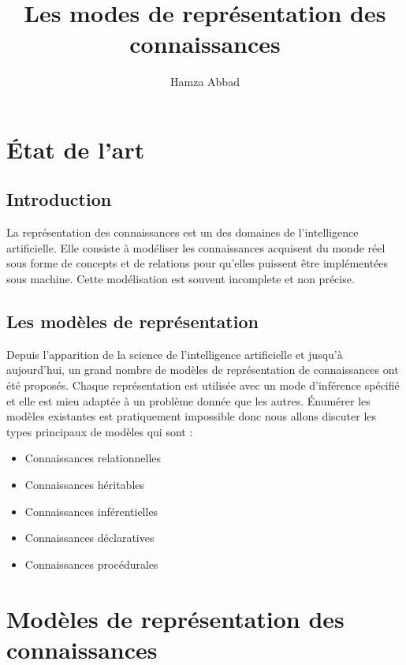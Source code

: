 \documentclass[12pt,a4paper]{report}
\author{Hamza Abbad}
\title{Les modes de représentation des connaissances}
\begin{document}
\maketitle
\chapter{\'Etat de l'art}
\section{Introduction}
La représentation des connaissances est un des domaines de l'intelligence artificielle. Elle consiste à modéliser
les connaissances acquisent du monde réel sous forme de concepts et de relations pour qu'elles puissent être
implémentées sous machine. Cette modélisation est souvent incomplete et non précise.\cite{WKR}

\section{Les modèles de représentation}
Depuis l'apparition de la science de l'intelligence artificielle et jusqu'à aujourd'hui, un grand nombre de modèles
de représentation de connaissances ont été proposés. Chaque représentation est utilisée avec un mode d'inférence spécifié
et elle est mieu adaptée à un problème donnée que les autres. \'Enumérer les modèles existantes est pratiquement impossible
donc nous allons discuter les types principaux de modèles qui sont :
\begin{itemize}
\item Connaissances relationnelles
\item Connaissances héritables
\item Connaissances inférentielles
\item Connaissances déclaratives
\item Connaissances procédurales\cite{KRC}
\end{itemize}

\chapter{Modèles de représentation des connaissances}
\end{document}
